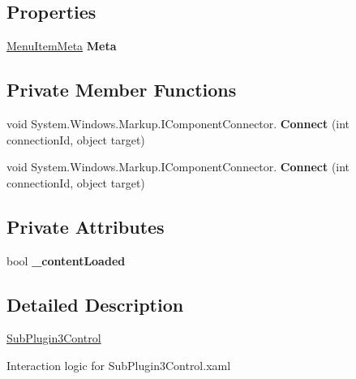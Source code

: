 \subsection*{Properties}
\begin{DoxyCompactItemize}
\item 
\mbox{\hyperlink{class_wpf_handler_1_1_plugins_1_1_menu_item_meta}{Menu\+Item\+Meta}} {\bfseries Meta}
\end{DoxyCompactItemize}
\subsection*{Private Member Functions}
\begin{DoxyCompactItemize}
\item 
\mbox{\label{class_example_plugin1_1_1_sub_plugin3_control_ac7faa88a631678e5237dd933bfbb2ca1}} 
void System.\+Windows.\+Markup.\+I\+Component\+Connector. {\bfseries Connect} (int connection\+Id, object target)
\item 
\mbox{\label{class_example_plugin1_1_1_sub_plugin3_control_ac7faa88a631678e5237dd933bfbb2ca1}} 
void System.\+Windows.\+Markup.\+I\+Component\+Connector. {\bfseries Connect} (int connection\+Id, object target)
\end{DoxyCompactItemize}
\subsection*{Private Attributes}
\begin{DoxyCompactItemize}
\item 
\mbox{\label{class_example_plugin1_1_1_sub_plugin3_control_a5cf98e14b27e768656c03df6b790bd4f}} 
bool {\bfseries \+\_\+content\+Loaded}
\end{DoxyCompactItemize}


\subsection{Detailed Description}
\mbox{\hyperlink{class_example_plugin1_1_1_sub_plugin3_control}{Sub\+Plugin3\+Control}} 

Interaction logic for Sub\+Plugin3\+Control.\+xaml 

